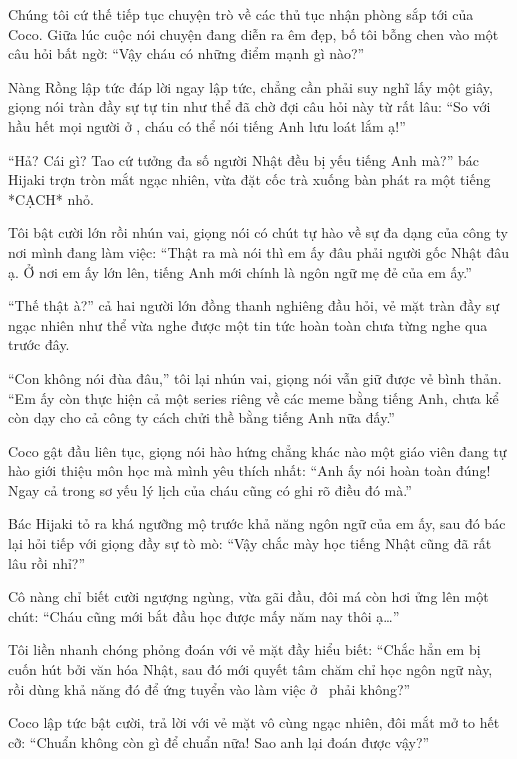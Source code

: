 \documentclass[../main.tex]{subfiles}
\begin{document}
\ct

Chúng tôi cứ thế tiếp tục chuyện trò về các thủ tục nhận phòng sắp tới của Coco. Giữa lúc cuộc nói chuyện đang diễn ra êm đẹp, bố tôi bỗng chen vào một câu hỏi bất ngờ: ``Vậy cháu có những điểm mạnh gì nào?''

Nàng Rồng lập tức đáp lời ngay lập tức, chẳng cần phải suy nghĩ lấy một giây, giọng nói tràn đầy sự tự tin như thể đã chờ đợi câu hỏi này từ rất lâu: ``So với hầu hết mọi người ở \hll, cháu có thể nói tiếng Anh lưu loát lắm ạ!''

``Hả? Cái gì? Tao cứ tưởng đa số người Nhật đều bị yếu tiếng Anh mà?'' bác Hijaki trợn tròn mắt ngạc nhiên, vừa đặt cốc trà xuống bàn phát ra một tiếng *CẠCH* nhỏ.

Tôi bật cười lớn rồi nhún vai, giọng nói có chút tự hào về sự đa dạng của công ty nơi mình đang làm việc: ``Thật ra mà nói thì em ấy đâu phải người gốc Nhật đâu ạ. Ở nơi em ấy lớn lên, tiếng Anh mới chính là ngôn ngữ mẹ đẻ của em ấy.''

``Thế thật à?'' cả hai người lớn đồng thanh nghiêng đầu hỏi, vẻ mặt tràn đầy sự ngạc nhiên như thể vừa nghe được một tin tức hoàn toàn chưa từng nghe qua trước đây.

``Con không nói đùa đâu,'' tôi lại nhún vai, giọng nói vẫn giữ được vẻ bình thản. ``Em ấy còn thực hiện cả một series riêng về các meme bằng tiếng Anh, chưa kể còn dạy cho cả công ty cách chửi thề bằng tiếng Anh nữa đấy.''

Coco gật đầu liên tục, giọng nói hào hứng chẳng khác nào một giáo viên đang tự hào giới thiệu môn học mà mình yêu thích nhất: ``Anh ấy nói hoàn toàn đúng! Ngay cả trong sơ yếu lý lịch của cháu cũng có ghi rõ điều đó mà.''

Bác Hijaki tỏ ra khá ngưỡng mộ trước khả năng ngôn ngữ của em ấy, sau đó bác lại hỏi tiếp với giọng đầy sự tò mò: ``Vậy chắc mày học tiếng Nhật cũng đã rất lâu rồi nhỉ?''

Cô nàng chỉ biết cười ngượng ngùng, vừa gãi đầu, đôi má còn hơi ửng lên một chút: ``Cháu cũng mới bắt đầu học được mấy năm nay thôi ạ\dots''

Tôi liền nhanh chóng phỏng đoán với vẻ mặt đầy hiểu biết: ``Chắc hẳn em bị cuốn hút bởi văn hóa Nhật, sau đó mới quyết tâm chăm chỉ học ngôn ngữ này, rồi dùng khả năng đó để ứng tuyển vào làm việc ở \hll\ phải không?''

Coco lập tức bật cười, trả lời với vẻ mặt vô cùng ngạc nhiên, đôi mắt mở to hết cỡ: ``Chuẩn không còn gì để chuẩn nữa! Sao anh lại đoán được vậy?''
\end{document}
